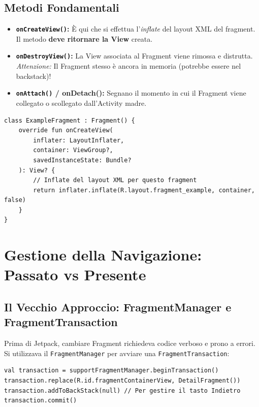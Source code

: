 \subsection{Metodi Fondamentali}
\begin{itemize}
    \item \textbf{\texttt{onCreateView()}:} È qui che si effettua l'\textit{inflate} del layout XML del fragment.
    Il metodo \textbf{deve ritornare la View} creata.
    \item \textbf{\texttt{onDestroyView()}:} La View associata al Fragment viene rimossa e distrutta. \textit{Attenzione:} Il Fragment stesso è ancora in memoria (potrebbe essere nel backstack)!
    \item \textbf{\texttt{onAttach()} / \textbf{onDetach()}:} Segnano il momento in cui il Fragment viene collegato o scollegato dall'Activity madre.
\end{itemize}

\begin{lstlisting}[caption={Creazione classica di un Fragment}, label={lst:fragment_create}]
class ExampleFragment : Fragment() {
    override fun onCreateView(
        inflater: LayoutInflater,
        container: ViewGroup?,
        savedInstanceState: Bundle?
    ): View? {
        // Inflate del layout XML per questo fragment
        return inflater.inflate(R.layout.fragment_example, container, false)
    }
}
\end{lstlisting}

\section{Gestione della Navigazione: Passato vs Presente}

\subsection{Il Vecchio Approccio: FragmentManager e FragmentTransaction}
Prima di Jetpack, cambiare Fragment richiedeva codice verboso e prono a errori.
Si utilizzava il \texttt{FragmentManager} per avviare una \texttt{FragmentTransaction}:
\begin{lstlisting}[caption={Vecchio approccio (Sconsigliato)}, label={lst:old_nav}]
val transaction = supportFragmentManager.beginTransaction()
transaction.replace(R.id.fragmentContainerView, DetailFragment())
transaction.addToBackStack(null) // Per gestire il tasto Indietro
transaction.commit()
\end{lstlisting}

